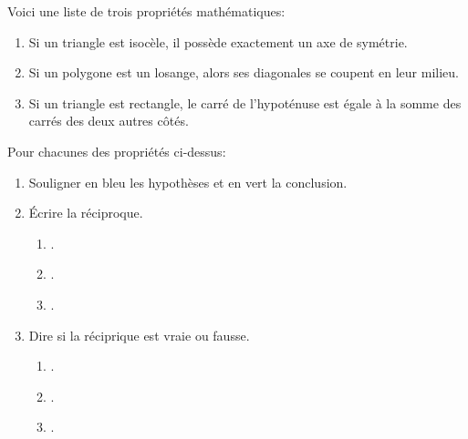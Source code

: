 \documentclass[../main.tex]{subfiles}
\begin{document}
\small
    Voici une liste de trois propriétés mathématiques:
    \begin{simplebox}
        \begin{enumerate}[A -, font=\bfseries]
            \item Si un triangle est isocèle, il possède exactement un axe de
            symétrie.
            \item Si un polygone est un losange, alors ses diagonales se
            coupent en leur milieu.
            \item Si un triangle est rectangle, le carré de l'hypoténuse est égale
            à la somme des carrés des deux autres côtés.
        \end{enumerate}
    \end{simplebox}\vspace{15pt}
    Pour chacunes des propriétés ci-dessus:
    \begin{enumerate}[1), font=\bfseries]
        \item Souligner en bleu les hypothèses et en vert la conclusion.
        \item Écrire la réciproque.\par
        \begin{enumerate}[A -, font=\bfseries]
            \item {}\dotedline.
            \item {}\dotedline.
            \item {}\dotedline.
        \end{enumerate}
        \item Dire si la réciprique est vraie ou fausse.\par
        \begin{enumerate}[A -, font=\bfseries]
            \item {}\dotedline.
            \item {}\dotedline.
            \item {}\dotedline.
        \end{enumerate}
    \end{enumerate}
\end{document}
